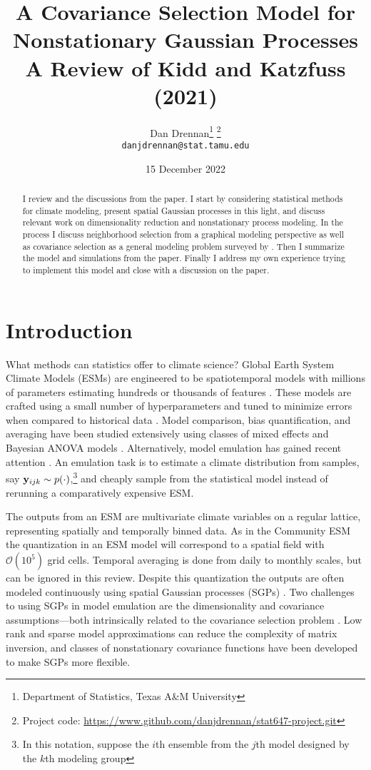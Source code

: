 \documentclass[letterpaper]{article}
\title{
  A Covariance Selection Model for Nonstationary Gaussian Processes \\[1ex]
  \Large A Review of Kidd and Katzfuss (2021)
}
\author{
  Dan Drennan\thanks{Department of Statistics, Texas A\&M University} \thanks{Project code: \url{https://www.github.com/danjdrennan/stat647-project.git}}\\
  \small{\texttt{danjdrennan@stat.tamu.edu}}
}
\date{15 December 2022}
\begin{document}
\maketitle

\begin{abstract}
  I review \citet{Kidd2021} and the discussions from the paper. I start by
  considering statistical methods for climate modeling, present spatial Gaussian
  processes in this light, and discuss relevant work on dimensionality reduction
  and nonstationary process modeling. In the process I discuss neighborhood
  selection from a graphical modeling perspective as well as covariance selection
  as a general modeling problem surveyed by \citet{Pourahmadi2011}. Then I summarize
  the model and simulations from the paper. Finally I address my own experience
  trying to implement this model and close with a discussion on the paper. 
\end{abstract}

\tableofcontents

\section{Introduction}\label{sec:introduction}

  What methods can statistics offer to climate science? Global Earth System
  Climate Models (ESMs) are engineered to be spatiotemporal models with millions
  of parameters estimating hundreds or thousands of features
  \citep[cf. \S~28.3.2 by Stephenson]{HandbookEES}. These models are crafted
  using a small number of hyperparameters and tuned to minimize errors when
  compared to historical data \citep{Masson2011,Knutti2013,Tilmes2018}. Model comparison,
  bias quantification, and averaging have been studied extensively using classes
  of mixed effects \citep{Jun2008} and Bayesian ANOVA models
  \citep{Kaufman2010,Tingley2012,Geinitz2015,Cressie2022}. Alternatively,
  model emulation has gained recent attention \citep{Castruccio2014}. An emulation
  task is to estimate a climate distribution from samples, say
  $\mathbf{y}_{ijk} \sim p(\cdot)$,\footnote{In this notation, suppose the $i$th ensemble
  from the $j$th model designed by the $k$th modeling group} and cheaply
  sample from the statistical model instead of rerunning a comparatively expensive
  ESM.
  
  The outputs from an ESM are multivariate climate variables on a regular lattice,
  representing spatially and temporally binned data. As in the Community ESM
  \citep{Tilmes2018} the quantization in an ESM model will correspond to a spatial
  field with $\mathcal{O}(10^{5})$ grid cells. Temporal averaging is done from daily
  to monthly scales, but can be ignored in this review. Despite this quantization
  the outputs are often modeled continuously using spatial Gaussian processes (SGPs)
  \citep{Heaton2019,Huang2021}. Two challenges to using SGPs in model emulation
  are the dimensionality and covariance assumptions---both intrinsically related
  to the covariance selection problem \citep{Dempster1972}. Low rank and sparse
  model approximations can reduce the complexity of matrix inversion, and classes
  of nonstationary covariance functions have been developed to make SGPs more flexible.
\end{document}
